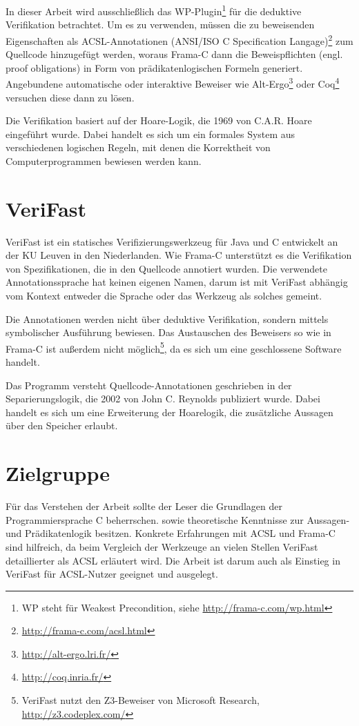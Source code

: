 In dieser Arbeit wird ausschließlich das WP-Plugin\footnote{WP steht für Weakest Precondition, siehe
\url{http://frama-c.com/wp.html}} für die deduktive Verifikation betrachtet. Um es zu verwenden, müssen die zu beweisenden 
Eigenschaften als ACSL-Annotationen (ANSI/ISO C Specification Langage)\footnote{\url{http://frama-c.com/acsl.html}} zum Quellcode hinzugefügt werden, woraus Frama-C dann die 
Beweispflichten (engl. proof obligations) in Form von prädikatenlogischen Formeln generiert. Angebundene automatische oder 
interaktive Beweiser wie Alt-Ergo\footnote{\url{http://alt-ergo.lri.fr/}} oder Coq\footnote{\url{http://coq.inria.fr/}}
versuchen diese dann zu lösen.

Die Verifikation basiert auf der Hoare-Logik, die 1969 von C.A.R. Hoare eingeführt wurde\cite{hoare}. Dabei
handelt es sich um ein formales System aus verschiedenen logischen Regeln, mit denen die Korrektheit von
Computerprogrammen bewiesen werden kann.


\section{VeriFast}
\label{sec:VeriFast}

VeriFast ist ein statisches Verifizierungswerkzeug für Java und C entwickelt an der KU Leuven in den Niederlanden.
Wie Frama-C unterstützt es die Verifikation von Spezifikationen, die in den Quellcode annotiert wurden. Die verwendete
Annotationssprache hat keinen eigenen Namen, darum ist mit \glqq VeriFast\grqq{} abhängig vom Kontext entweder die Sprache oder das
Werkzeug als solches gemeint.

Die Annotationen werden nicht über deduktive Verifikation, sondern mittels symbolischer Ausführung bewiesen. Das Austauschen
des Beweisers so wie in Frama-C ist außerdem nicht möglich\footnote{VeriFast nutzt den Z3-Beweiser von Microsoft Research,
\url{http://z3.codeplex.com/}}, da es sich um eine geschlossene Software handelt.

Das Programm versteht Quellcode-Annotationen geschrieben in der Separierungslogik, die 2002 von John C. Reynolds publiziert
wurde\cite{reynolds-2002}. Dabei handelt es sich um eine Erweiterung der Hoarelogik, die zusätzliche Aussagen über den Speicher
erlaubt.


\section{Zielgruppe}
\label{sec:zielgruppe}

Für das Verstehen der Arbeit sollte der Leser die Grundlagen der Programmiersprache C beherrschen.
sowie theoretische Kenntnisse zur Aussagen- und Prädikatenlogik besitzen.
Konkrete Erfahrungen mit ACSL und Frama-C sind hilfreich, da beim Vergleich der Werkzeuge an vielen
Stellen VeriFast detaillierter als ACSL erläutert wird. Die Arbeit ist darum auch als Einstieg in VeriFast
für ACSL-Nutzer geeignet und ausgelegt.

 

